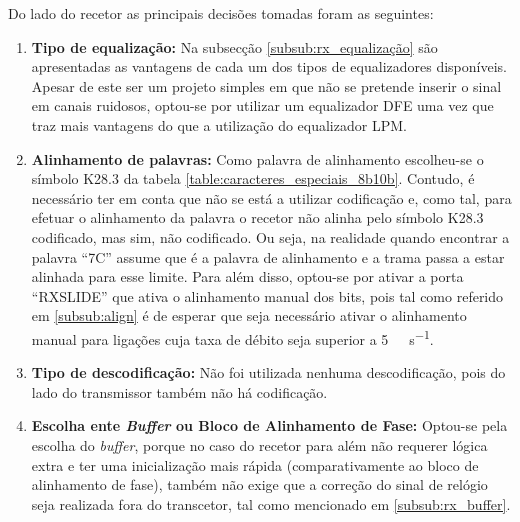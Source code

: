 Do lado do recetor as principais decisões tomadas foram as seguintes:
\begin{enumerate}
	\item \textbf{Tipo de equalização:} Na subsecção \ref{subsub:rx_equalização} são apresentadas as vantagens de cada um dos tipos de equalizadores disponíveis. Apesar de este ser um projeto simples em que não se pretende inserir o sinal em canais ruidosos, optou-se por utilizar um equalizador DFE uma vez que traz mais vantagens do que a utilização do equalizador LPM.
	
	\item \textbf{Alinhamento de palavras:} Como palavra de alinhamento escolheu-se o símbolo K28.3 da tabela \ref{table:caracteres_especiais_8b10b}. Contudo, é necessário ter em conta que não se está a utilizar codificação e, como tal, para efetuar o alinhamento da palavra o recetor não alinha pelo símbolo K28.3 codificado, mas sim, não codificado. Ou seja, na realidade quando encontrar a palavra ``7C'' assume que é a palavra de alinhamento e a trama passa a estar alinhada para esse limite. Para além disso, optou-se por ativar a porta ``RXSLIDE'' que ativa o alinhamento manual dos bits, pois tal como referido em \ref{subsub:align} é de esperar que seja necessário ativar o alinhamento manual para ligações cuja taxa de débito seja superior a \SI{5}{\giga\bit\per\second}.
	
	\item \textbf{Tipo de descodificação:} Não foi utilizada nenhuma descodificação, pois do lado do transmissor também não há codificação.
	\item \textbf{Escolha ente \textit{Buffer} ou Bloco de Alinhamento de Fase:} Optou-se pela escolha do \textit{buffer}, porque no caso do recetor para além não requerer lógica extra e ter uma inicialização mais rápida (comparativamente ao bloco de alinhamento de fase), também não exige que a correção do sinal de relógio seja realizada fora do transcetor, tal como mencionado em \ref{subsub:rx_buffer}.
\end{enumerate}

